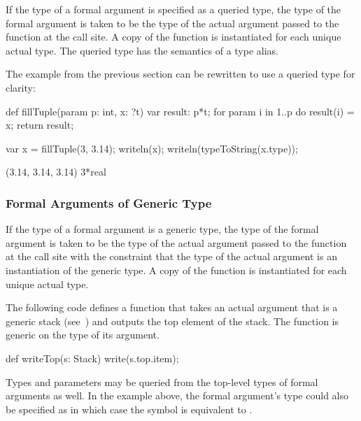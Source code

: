 If the type of a formal argument is specified as a queried type, the
type of the formal argument is taken to be the type of the actual
argument passed to the function at the call site.  A copy of the
function is instantiated for each unique actual type.  The queried
type has the semantics of a type alias.
\begin{example}
The example from the previous section can be rewritten to use a
queried type for clarity:
\begin{chapelpre}
\end{chapelpre}
\begin{chapel}
def fillTuple(param p: int, x: ?t) {
  var result: p*t;
  for param i in 1..p do
    result(i) = x;
  return result;
}
\end{chapel}
\begin{chapelpost}
var x = fillTuple(3, 3.14);
writeln(x);
writeln(typeToString(x.type));
\end{chapelpost}
\begin{chapeloutput}
(3.14, 3.14, 3.14)
3*real
\end{chapeloutput}
\end{example}

\subsubsection{Formal Arguments of Generic Type}
\label{Formal_Arguments_of_Generic_Type}

If the type of a formal argument is a generic type, the type of the
formal argument is taken to be the type of the actual argument passed
to the function at the call site with the constraint that the type of
the actual argument is an instantiation of the generic type.  A copy
of the function is instantiated for each unique actual type.
\begin{example}
The following code defines a function  that takes an
actual argument that is a generic stack
(see~) and outputs the top element of the
stack.  The function is generic on the type of its argument.
\begin{chapel}
def writeTop(s: Stack) {
  write(s.top.item);
}
\end{chapel}
\end{example}

Types and parameters may be queried from the top-level types of formal
arguments as well.  In the example above, the formal argument's type
could also be specified as  in which case the
symbol  is equivalent to .


